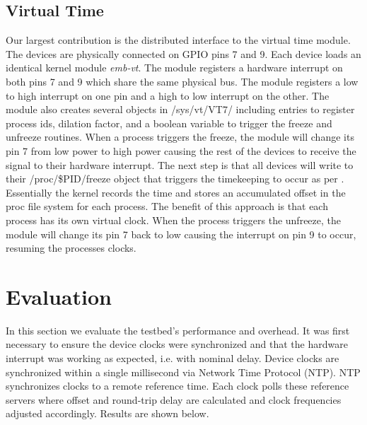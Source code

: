 \subsection{Virtual Time}
Our largest contribution is the distributed interface to the virtual time module. The devices are physically connected on GPIO pins 7 and 9. Each device loads an identical kernel module \textit{emb-vt}. The module registers a hardware interrupt on both pins 7 and 9 which share the same physical bus. The module registers a low to high interrupt on one pin and a high to low interrupt on the other. The module also creates several objects in /sys/vt/VT7/ including entries to register process ids, dilation factor, and a boolean variable to trigger the freeze and unfreeze routines.
When a process triggers the freeze, the module will change its pin 7 from low power to high power causing the rest of the devices to receive the signal to their hardware interrupt. The next step is that all devices will write to their /proc/\$PID/freeze object that triggers the timekeeping to occur as per \cite{Yan:VTS:pads15}.
Essentially the kernel records the time and stores an accumulated offset in the proc file system for each process. The benefit of this approach is that each process has its own virtual clock.
When the process triggers the unfreeze, the module will change its pin 7 back to low causing the interrupt on pin 9 to occur, resuming the processes clocks.

\section{Evaluation}
In this section we evaluate the testbed's performance and overhead. It was first necessary to ensure the device clocks were synchronized and that the hardware interrupt was working as expected, i.e. with nominal delay. Device clocks are synchronized  within a single millisecond via Network Time Protocol (NTP). NTP synchronizes clocks to a remote reference time. Each clock polls these reference servers where offset and round-trip delay are calculated and clock frequencies adjusted accordingly. Results are shown below.

